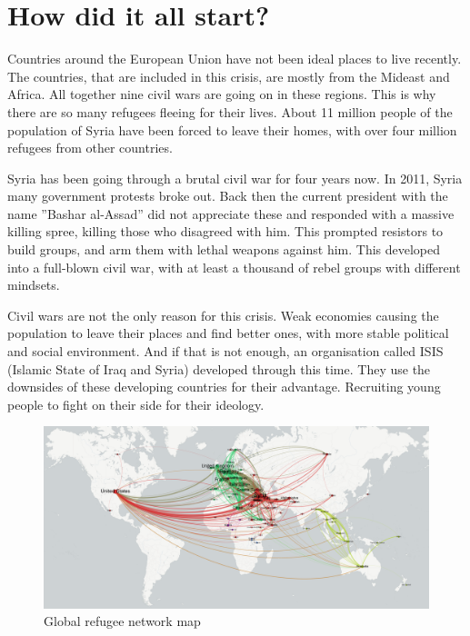 
\section{How did it all start?}

Countries around the European Union have not been ideal places to live recently. The countries, that are included in this crisis, are mostly from the Mideast and Africa. All together nine civil wars are going on in these regions. This is why there are so many refugees fleeing for their lives. About 11 million people of the population of Syria have been forced to leave their homes, with over four million refugees from other countries.

Syria has been going through a brutal civil war for four years now. In 2011, Syria many government protests broke out.
Back then the current president with the name ''Bashar al-Assad'' did not appreciate these and responded with a massive killing spree, killing those who disagreed with him. This prompted resistors to build groups, and arm them with lethal weapons against him. This developed into a full-blown civil war, with at least a thousand of rebel groups with different mindsets.

Civil wars are not the only reason for this crisis. Weak economies causing the population to leave their places and find better ones, with more stable political and social environment. And if that is not enough, an organisation called ISIS (Islamic State of Iraq and Syria) developed through this time. They use the downsides of these developing countries for their advantage. Recruiting young people to fight on their side for their ideology.

\begin{figure}[!h]
	\begin{center}
		\includegraphics[width=\linewidth]{images/global-refugee-network-geo}
		\caption{Global refugee network map}
	\end{center}
\end{figure}

